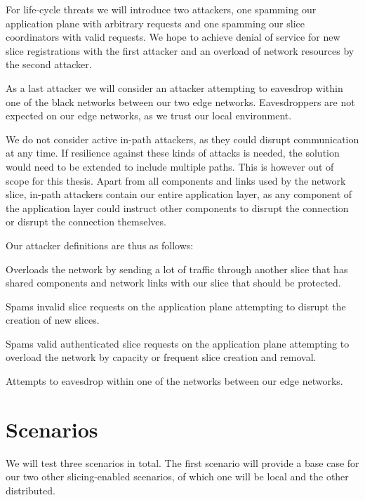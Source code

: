 For life-cycle threats we will introduce two attackers, one spamming our application plane with arbitrary requests and one spamming our slice coordinators with valid requests. We hope to achieve denial of service for new slice registrations with the first attacker and an overload of network resources by the second attacker.

As a last attacker we will consider an attacker attempting to eavesdrop within one of the black networks between our two edge networks. Eavesdroppers are not expected on our edge networks, as we trust our local environment.

We do not consider active in-path attackers, as they could disrupt communication at any time. If resilience against these kinds of attacks is needed, the solution would need to be extended to include multiple paths. This is however out of scope for this thesis. Apart from all components and links used by the network slice, in-path attackers contain our entire application layer, as any component of the application layer could instruct other components to disrupt the connection or disrupt the connection themselves.

Our attacker definitions are thus as follows:
\begin{description}[style=multiline, labelwidth=0.7cm]
    \item[\namedlabel{A1}{A1}] Overloads the network by sending a lot of traffic through another slice that has shared components and network links with our slice that should be protected.
    \item[\namedlabel{A2}{A2}] Spams invalid slice requests on the application plane attempting to disrupt the creation of new slices.
    \item[\namedlabel{A3}{A3}] Spams valid authenticated slice requests on the application plane attempting to overload the network by capacity or frequent slice creation and removal.
    \item[\namedlabel{A4}{A4}] Attempts to eavesdrop within one of the networks between our edge networks.
\end{description}

\section{Scenarios}
We will test three scenarios in total. The first scenario will provide a base case for our two other slicing-enabled scenarios, of which one will be local and the other distributed.

